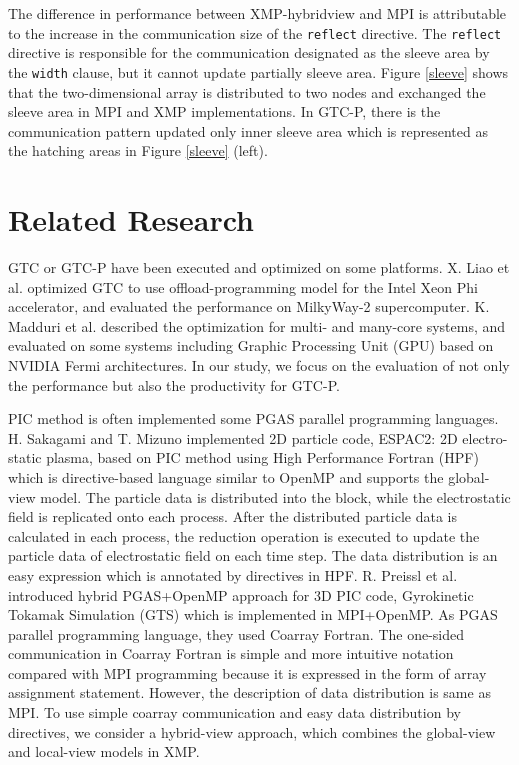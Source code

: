 The difference in performance between XMP-hybridview and MPI is attributable to the increase in the communication size of the {\tt reflect} directive. The {\tt reflect} directive is responsible for the communication designated as the sleeve area by the {\tt width} clause, but it cannot update partially sleeve area. Figure \ref{sleeve} shows that the two-dimensional array is distributed to two nodes and exchanged the sleeve area in MPI and XMP implementations. In GTC-P, there is the communication pattern updated only inner sleeve area which is represented as the hatching areas in Figure \ref{sleeve} (left).


\section{Related Research \label{sec5}}

GTC or GTC-P have been executed and optimized on some platforms. X. Liao et al.\cite{PHI-GTC} optimized GTC to use offload-programming model for the Intel Xeon Phi accelerator, and evaluated the performance on MilkyWay-2 supercomputer. K. Madduri et al.\cite{MANY-GTC} described the optimization for multi- and many-core systems, and evaluated on some systems including Graphic Processing Unit (GPU) based on NVIDIA Fermi architectures. In our study, we focus on the evaluation of not only the performance but also the productivity for GTC-P.

PIC method is often implemented some PGAS parallel programming languages. H. Sakagami and T. Mizuno\cite{HPF-PIC} implemented 2D particle code, ESPAC2: 2D electro-static plasma, based on PIC method using High Performance Fortran (HPF) \cite{HPF} which is directive-based language similar to OpenMP and supports the global-view model. The particle data is distributed into the block, while the electrostatic field is replicated onto each process. After the distributed particle data is calculated in each process, the reduction operation is executed to update the particle data of electrostatic field on each time step. The data distribution is an easy expression which is annotated by directives in HPF.  R. Preissl et al.\cite{CAF-GTC} introduced hybrid PGAS+OpenMP approach for 3D PIC code, Gyrokinetic Tokamak Simulation (GTS) which is implemented in MPI+OpenMP. As PGAS parallel programming language, they used Coarray Fortran. The one-sided communication in Coarray Fortran is simple and more intuitive notation compared with MPI programming because it is expressed in the form of array assignment statement. However, the description of data distribution is same as MPI. To use simple coarray communication and easy data distribution by directives, we consider a hybrid-view approach, which combines the global-view and local-view models in XMP. 

